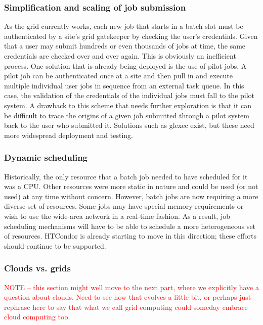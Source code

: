 \subsubsection{Simplification and scaling of job submission}

As the grid currently works, each new job that starts in a batch slot must be authenticated by a site’s grid gatekeeper by checking the user’s credentials.  Given that a user may submit hundreds or even thousands of jobs at time, the same credentials are checked over and over again.  This is obviously an inefficient process.  One solution that is already being deployed is the use of pilot jobs.  A pilot job can be authenticated once at a site and then pull in and execute multiple individual user jobs in sequence from an external task queue.  In this case, the validation of the credentials of the individual jobs must fall to the pilot system.  A drawback to this scheme that needs further exploration is that it can be difficult to trace the origins of a given job submitted through a pilot system back to the user who submitted it.  Solutions such as glexec exist, but these need more widespread deployment and testing.

\subsubsection{Dynamic scheduling}

Historically, the only resource that a batch job needed to have scheduled for it was a CPU.  Other resources were more static in nature and could be used (or not used) at any time without concern.  However, batch jobs are now requiring a more diverse set of resources.  Some jobs may have special memory requirements or wish to use the wide-area network in a real-time fashion.  As a result, job scheduling mechanisms will have to be able to schedule a more heterogeneous set of resources.  HTCondor is already starting to move in this direction; these efforts should continue to be supported.

\subsubsection{Clouds vs. grids}

\textcolor{red}{NOTE -- this section might well move to the next part, where we explicitly have a question about clouds.  Need to see how that evolves a little bit, or perhaps just rephrase here to say that what we call grid computing could someday embrace cloud computing too.}

